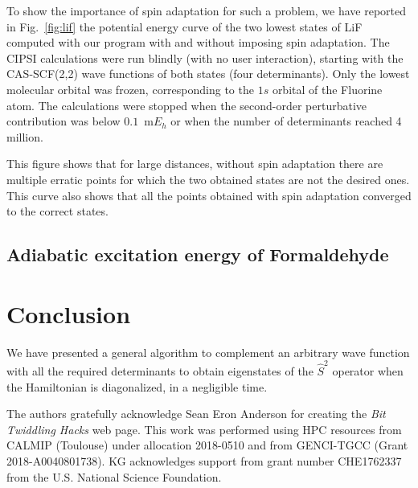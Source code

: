 \documentclass[aip,jcp,reprint,showkeys]{revtex4-1}
\newcommand{\stwo}{\hat{S}^2}
\begin{document}
To show the importance of spin adaptation for such a problem, we have reported
in Fig.~\ref{fig:lif} the potential energy curve of the two lowest states of
LiF computed with our program with and without imposing spin adaptation.  The
CIPSI calculations were run blindly (with no user interaction), starting with
the CAS-SCF(2,2) wave functions of both states (four determinants). Only the
lowest molecular orbital was frozen, corresponding to the $1s$ orbital of the
Fluorine atom. The calculations were stopped when the second-order perturbative
contribution was below $0.1$~m$E_h$ or when the number of determinants reached
4 million.

This figure shows that for large distances, without spin adaptation there are
multiple erratic points for which the two obtained states are not the desired
ones. This curve also shows that all the points obtained with spin adaptation
converged to the correct states.

\subsection{Adiabatic excitation energy of Formaldehyde}


\section{Conclusion}

We have presented a general algorithm to complement an arbitrary wave function
with all the required determinants to obtain eigenstates of the $\stwo$
operator when the Hamiltonian is diagonalized, in a negligible time.


\begin{acknowledgments}
The authors gratefully acknowledge Sean Eron Anderson for creating the 
\emph{Bit Twiddling Hacks} web page.
This work was performed using HPC resources from CALMIP (Toulouse) under
allocation 2018-0510 and from GENCI-TGCC (Grant 2018-A0040801738).
KG acknowledges support from grant number CHE1762337 from the U.S. National Science Foundation.
\end{acknowledgments}



\end{document}
